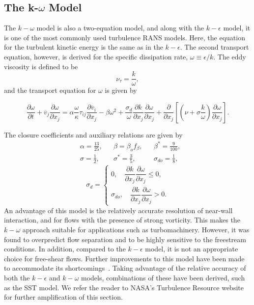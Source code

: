 \subsection{The k-$\omega$ Model}
The $k-\omega$ model is also a two-equation model, and along with the $k-\epsilon$ model, it is one of the most commonly used turbulence RANS models. Here, the equation for the turbulent kinetic energy is the same as in the $k-\epsilon$. The second transport equation, however, is derived for the specific dissipation rate, $\omega\equiv\epsilon/k$. The eddy viscosity is defined to be
\begin{equation}
    \nu_\tau = \frac{k}{\omega},
\end{equation}
and the transport equation for $\omega$ is given by~\cite{wilcox1998turbulence}
\begin{eqBox}
\begin{equation}
    \frac{\partial \omega}{\partial t} + \overline v_j \frac{\partial \omega}{\partial x_j} = \alpha \frac{\omega}{\kappa} \tau_{ij} 
    \frac{\partial \overline v_i}{\partial x_j} - \beta \omega^2 + \frac{\sigma_d}{\omega} \frac{\partial k}{\partial x_j} 
    \frac{\partial \omega}{\partial x_j} + \frac{\partial}{\partial x_j} \left[\left(\nu + \sigma\frac{k}{\omega}\right)\frac{\partial \omega}{\partial x_j}\right].
\end{equation}
\end{eqBox}
The closure coefficients and auxiliary relations are given by
\begin{align}
& \alpha= \frac{13}{25}, & & \beta = \beta_o f_\beta, & & \beta^* = \frac{9}{100}, \\
& \sigma = \frac{1}{2}, & & \sigma^* = \frac{3}{5}, & & \sigma_{do} = \frac{1}{8},
\end{align}
\[
    \sigma_{d} = 
\begin{cases}
    0,  \quad \dfrac{\partial k}{\partial x_j} \dfrac{\partial\omega}{\partial x_j}  \leq 0, \\
    \sigma_{do}, \quad \dfrac{\partial k}{\partial x_j} \dfrac{\partial\omega}{\partial x_j} > 0.
\end{cases}
\]
An advantage of this model is the relatively accurate resolution of near-wall interaction, and for flows with the presence of strong vorticity. This makes the $k-\omega$ approach suitable for applications such as turbomachinery. However, it was found to overpredict flow separation and to be highly sensitive to the freestream conditions. In addition, compared to the $k-\epsilon$ model, it is not an appropriate choice for free-shear flows. Further improvements to this model have been made to accommodate its shortcomings~\cite{}. Taking advantage of the relative accuracy of both the $k-\epsilon$ and $k-\omega$ models, combinations of these have been derived, such as the SST model. We refer the reader to NASA's Turbulence Resource website for further amplification of this section.

